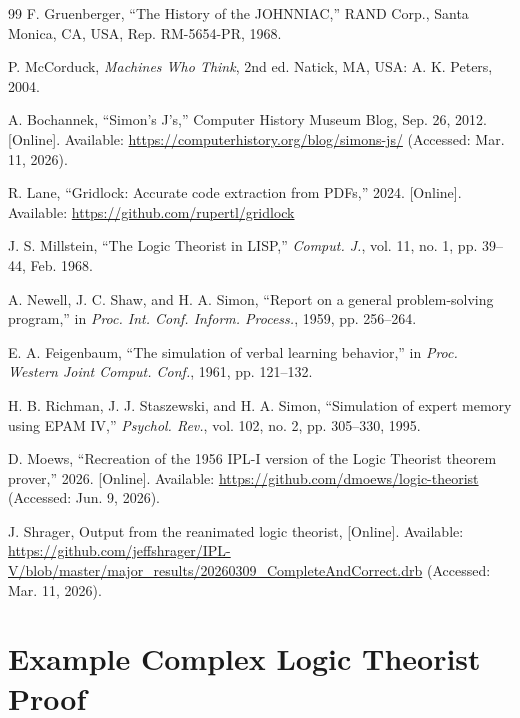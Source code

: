 \documentclass[journal]{IEEEtran}
\begin{document}
\begin{thebibliography}{99}
 F. Gruenberger, ``The History of the
  JOHNNIAC,'' RAND Corp., Santa Monica, CA, USA, Rep. RM-5654-PR,
  1968.

 P. McCorduck, \textit{Machines Who
  Think}, 2nd ed. Natick, MA, USA: A. K. Peters, 2004.

 A. Bochannek, ``Simon's J's,''
  Computer History Museum Blog, Sep. 26, 2012. [Online]. Available:
  \url{https://computerhistory.org/blog/simons-js/} (Accessed:
  Mar. 11, 2026).

 R. Lane, ``Gridlock: Accurate code
  extraction from PDFs,'' 2024. [Online]. Available:
  \url{https://github.com/rupertl/gridlock}

 J. S. Millstein, ``The Logic Theorist in
  LISP,'' \textit{Comput. J.}, vol. 11, no. 1, pp. 39--44, Feb. 1968.

 A. Newell, J. C. Shaw, and H. A. Simon,
  ``Report on a general problem-solving program,'' in
  \textit{Proc. Int. Conf. Inform. Process.}, 1959, pp. 256--264.

 E. A. Feigenbaum, ``The simulation of
  verbal learning behavior,'' in \textit{Proc. Western Joint
    Comput. Conf.}, 1961, pp. 121--132.

 H. B. Richman, J. J. Staszewski, and
  H. A. Simon, ``Simulation of expert memory using EPAM IV,''
  \textit{Psychol. Rev.}, vol. 102, no. 2, pp. 305--330, 1995.

 D. Moews, ``Recreation of the 1956 IPL-I version
  of the Logic Theorist theorem prover,'' 2026. [Online]. Available:
  \url{https://github.com/dmoews/logic-theorist} (Accessed: Jun. 9,
  2026).

 J. Shrager, Output from the reanimated logic
  theorist, [Online]. Available:
  \url{https://github.com/jeffshrager/IPL-V/blob/master/major_results/20260309_CompleteAndCorrect.drb}
  (Accessed: Mar. 11, 2026).

\end{thebibliography}

\clearpage %
\onecolumn %

\appendix

\section{Example Complex Logic Theorist Proof}
\end{document}
